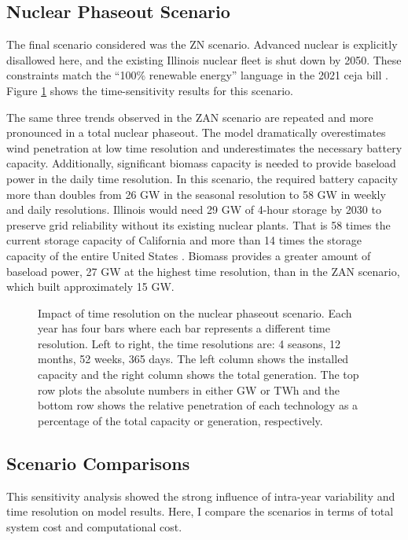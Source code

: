 \subsection{Nuclear Phaseout Scenario}
The final scenario considered was the \gls{ZN} scenario. Advanced
nuclear is explicitly disallowed here, and the existing Illinois nuclear fleet is shut down by
2050. These constraints match the ``100\% renewable energy'' language in the 2021
\gls{ceja} bill \cite{harmon_climate_2021}. Figure \ref{fig:time_res_ZN} shows
the time-sensitivity results for this scenario.

The same three trends observed in the \gls{ZAN} scenario are repeated and
more pronounced in a total nuclear phaseout. The model dramatically overestimates
wind penetration at low time resolution and underestimates the necessary battery capacity.
Additionally, significant biomass capacity is needed to provide baseload
power in the daily time resolution.
In this scenario, the required battery capacity more than doubles from 26 GW in the
seasonal resolution to 58 GW in weekly and daily resolutions. Illinois would need 29 GW of 4-hour
storage by 2030 to preserve grid reliability without its existing nuclear plants.
That is 58 times the current storage capacity of California and more than
14 times the storage capacity of the entire United States
\cite{hutchins_us_2021}.
Biomass provides a greater amount of baseload power, 27 GW at the highest
time resolution, than in the \gls{ZAN} scenario, which built approximately 15 GW.
\begin{figure}[H]
  \centering
  \resizebox{0.95\columnwidth}{!}{}
  \caption{Impact of time resolution on the nuclear phaseout scenario.  Each
  year has four bars where each bar represents a different time resolution.
  Left to right, the time resolutions are: 4 seasons, 12 months, 52 weeks, 365 days.
  The left column shows the installed capacity and the right column shows the
  total generation. The top row plots the absolute numbers in either GW or TWh
  and the bottom row shows the relative penetration of each technology as a
  percentage of the total capacity or generation, respectively.}
  \label{fig:time_res_ZN}
\end{figure}


\subsection{Scenario Comparisons}
This sensitivity analysis showed the strong influence of intra-year variability
and time resolution on model results. Here, I compare the scenarios in terms
of total system cost and computational cost.

